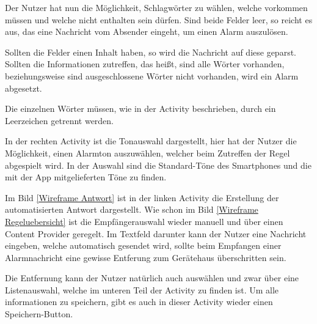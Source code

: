 Der Nutzer hat nun die M\"oglichkeit, Schlagw\"orter zu w\"ahlen, welche vorkommen m\"ussen und welche nicht enthalten sein d\"urfen. Sind beide Felder leer, so reicht es aus, das eine Nachricht vom Absender eingeht, um einen Alarm auszul\"osen.

Sollten die Felder einen Inhalt haben, so wird die Nachricht auf diese geparst. Sollten die Informationen zutreffen, das hei\ss{}t, sind alle W\"orter vorhanden, beziehungsweise sind ausgeschlossene W\"orter nicht vorhanden, wird ein Alarm abgesetzt. 

Die einzelnen W\"orter m\"ussen, wie in der Activity beschrieben, durch ein Leerzeichen getrennt werden.

In der rechten Activity ist die Tonauswahl dargestellt, hier hat der Nutzer die M\"oglichkeit, einen Alarmton auszuw\"ahlen, welcher beim Zutreffen der Regel abgespielt wird. In der Auswahl sind die Standard-T\"one des Smartphones und die mit der App mitgelieferten T\"one zu finden.

Im Bild \ref{Wireframe Antwort} ist in der linken Activity die Erstellung der automatisierten Antwort dargestellt. Wie schon im Bild \ref{Wireframe Regeluebersicht} ist die Empf\"angerauswahl wieder manuell und \"uber einen Content Provider geregelt. Im Textfeld darunter kann der Nutzer eine Nachricht eingeben, welche automatisch gesendet wird, sollte beim Empfangen einer Alarmnachricht eine gewisse Entferung zum Ger\"atehaus \"uberschritten sein.

Die Entfernung kann der Nutzer nat\"urlich auch ausw\"ahlen und zwar \"uber eine Listenauswahl, welche im unteren Teil der Activity zu finden ist. Um alle informationen zu speichern, gibt es auch in dieser Activity wieder einen Speichern-Button.

